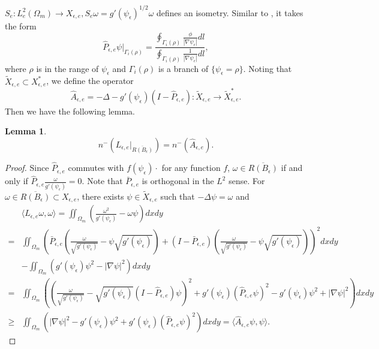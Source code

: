 \documentclass[1 [leqno, 11pt]{amsart}
\numberwithin{equation}{section}
\let\ep=\epsilon
\newtheorem{lemma}[Theorem]{Lemma}
\begin{document}
\begin{CJK*}{GBK}{song}
$S_e: L_e^2(\Omega_m) \rightarrow X_{\ep,e},  S_e\omega = g'(\psi_\ep)^{1/2}\omega$
defines an isometry.
Similar to \cite{lin2004some}, it takes the form
$$\hat{P}_{\ep,e} \psi|_{\Gamma_{i}(\rho)} = \frac{\oint_{\Gamma_i (\rho)} \frac{\phi}{|\nabla \psi_\ep|}dl}{\oint_{\Gamma_i (\rho)} \frac{1}{|\nabla \psi_\ep|}dl},$$
where $\rho$ is in the range of $\psi_\ep$ and $\Gamma_i(\rho)$ is a branch of $\{\psi_\ep = \rho\}$. Noting that $\tilde{X}_{\ep, e}\subset X_{\ep, e}^*$, we  define the operator
$$\hat{A}_{\ep,e} = - \Delta - g'(\psi_\ep)(I - \hat{P}_{\ep,e}): \tilde{X}_{\ep, e} \rightarrow \tilde{X}^*_{\ep, e}.$$
Then we have the following lemma.
\begin{lemma}\label{L e-hat A}
$$n^-\left( L_{\ep,e} |_{\overline{R(B_\ep)}} \right) = n^-\left(\hat{A}_{\ep,e}\right).$$
\end{lemma}
\begin{proof} Since $\hat{P}_{\ep,e}$  commutes with $f(\psi_\ep)\cdot$ for any function $f$,  $\omega \in \overline{R(B_\ep)}$ if and only if $\hat{P}_{\ep,e} \frac{\omega}{g'(\psi_\ep)} = 0$. Note that $\bar{P}_{\ep,e}$ is orthogonal in the $L^2$ sense.
For $\omega \in \overline{R(B_\ep)}\subset X_{\ep,e}$, there exists $\psi \in \tilde{X}_{\ep, e}$ such that $-\Delta\psi=\omega$ and
\begin{align*}
&\langle L_{\ep,e} \omega, \omega \rangle
= \iint_{\Omega_m} \left(\frac{\omega^2}{g'(\psi_\ep)} - \omega \psi\right) dxdy \\
= &\iint_{\Omega_m}\left(\bar{P}_{\ep,e}\left( \frac{\omega}{\sqrt{g'(\psi_\ep)}} - \psi \sqrt{g'(\psi_\ep)}\right)+(I-\bar{P}_{\ep,e})\left( \frac{\omega}{\sqrt{g'(\psi_\ep)}} - \psi \sqrt{g'(\psi_\ep)}\right) \right)^2 dxdy \\
&- \iint_{\Omega_m}\left(g'(\psi_\ep)\psi^2 -|\nabla \psi|^2\right) dxdy \\
=& \iint_{\Omega_m} \left(\left( \frac{\omega}{\sqrt{g'(\psi_\ep)}} - \sqrt{g'(\psi_\ep)} (I - \hat{P}_{\ep,e}) \psi \right)^2 + g'(\psi_\ep) (\hat{P}_{\ep,e} \psi)^2  - g'(\psi_\ep)\psi^2 + |\nabla \psi|^2 \right)dxdy \\
 \geq& \iint_{\Omega_m} \left(|\nabla \psi|^2 - g'(\psi_\ep)\psi^2 + g'(\psi_\ep) (\hat{P}_{\ep,e}\psi)^2 \right)dxdy = \langle\hat{A}_{\ep,e} \psi, \psi\rangle.
\end{align*}


\end{proof}
\end{CJK*}
\end{document}
